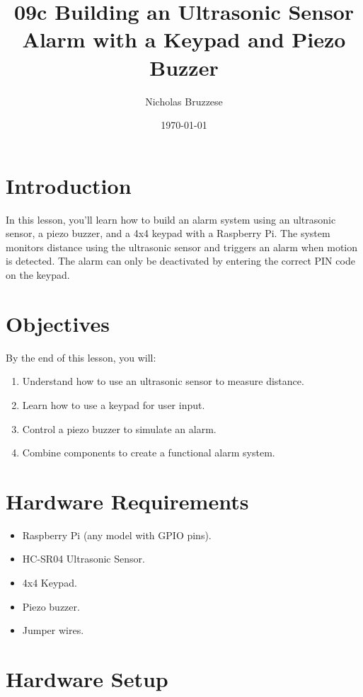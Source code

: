 \documentclass{article}
\title{09c Building an Ultrasonic Sensor Alarm with a Keypad and Piezo Buzzer}
\author{Nicholas Bruzzese}
\date{\today}
\begin{document}
	
	\maketitle
	
	\section*{Introduction}
	In this lesson, you’ll learn how to build an alarm system using an ultrasonic sensor, a piezo buzzer, and a 4x4 keypad with a Raspberry Pi. The system monitors distance using the ultrasonic sensor and triggers an alarm when motion is detected. The alarm can only be deactivated by entering the correct PIN code on the keypad.
	
	\section*{Objectives}
	By the end of this lesson, you will:
	\begin{enumerate}
		\item Understand how to use an ultrasonic sensor to measure distance.
		\item Learn how to use a keypad for user input.
		\item Control a piezo buzzer to simulate an alarm.
		\item Combine components to create a functional alarm system.
	\end{enumerate}
	
	\section*{Hardware Requirements}
	\begin{itemize}
		\item Raspberry Pi (any model with GPIO pins).
		\item HC-SR04 Ultrasonic Sensor.
		\item 4x4 Keypad.
		\item Piezo buzzer.
		\item Jumper wires.
	\end{itemize}
	
	\section*{Hardware Setup}
\end{document}
